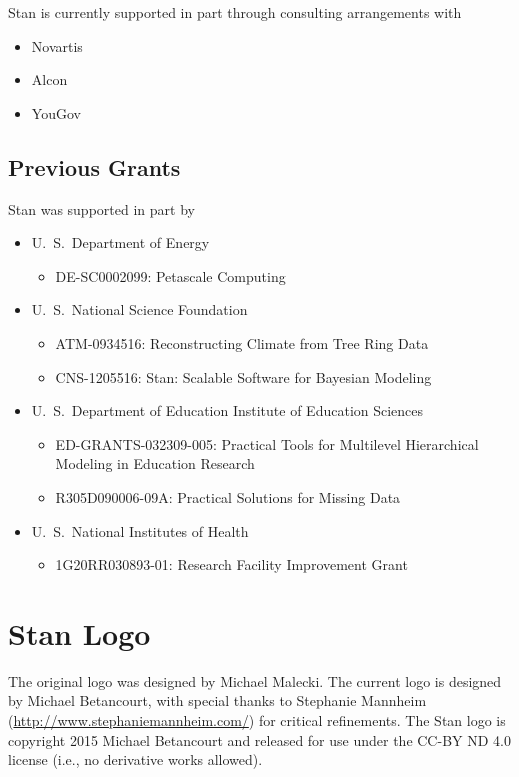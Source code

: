 Stan is currently supported in part through consulting arrangements
with
\begin{itemize}
\item Novartis 
\item Alcon
\item YouGov
\end{itemize}


\subsection*{Previous Grants}

Stan was supported in part by
%
\begin{itemize}
\item
U.~S.\ Department of Energy 
\begin{itemize}\small
\item DE-SC0002099: Petascale Computing
\end{itemize}
%
\item
U.~S.\ National Science Foundation 
\begin{itemize}\small
\item
ATM-0934516: Reconstructing Climate from Tree Ring Data
\item
CNS-1205516: Stan: Scalable Software for Bayesian Modeling
\end{itemize}
%
\item
U.~S.\ Department of Education Institute of Education Sciences 
\begin{itemize}\small
\item ED-GRANTS-032309-005:
Practical Tools for Multilevel Hierarchical Modeling in Education
 Research
\item R305D090006-09A: Practical Solutions for Missing Data
\end{itemize}
\item
U.~S.\ National Institutes of Health
\begin{itemize}
\item 1G20RR030893-01: Research Facility Improvement Grant
\end{itemize}
\end{itemize}


\section*{Stan Logo}

The original logo was designed by Michael Malecki.  The current logo
is designed by Michael Betancourt, with special thanks to Stephanie
Mannheim (\url{http://www.stephaniemannheim.com/}) for critical
refinements.  The Stan logo is copyright 2015 Michael Betancourt and
released for use under the CC-BY ND 4.0 license (i.e., no derivative
works allowed).


